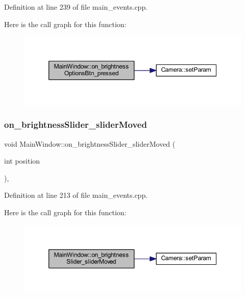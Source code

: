 Definition at line 239 of file main\+\_\+events.\+cpp.

Here is the call graph for this function\+:
\nopagebreak
\begin{figure}[H]
\begin{center}
\leavevmode
\includegraphics[width=350pt]{classMainWindow_a8b3a042f694a5013ad5e65253bc3a0ae_cgraph}
\end{center}
\end{figure}
\mbox{\label{classMainWindow_aaaa1dd957c7f0cc75f5dec42ef429c81}} 
\subsubsection{\texorpdfstring{on\_brightnessSlider\_sliderMoved}{on\_brightnessSlider\_sliderMoved}}
{\footnotesize\ttfamily void Main\+Window\+::on\+\_\+brightness\+Slider\+\_\+slider\+Moved (\begin{DoxyParamCaption}\item[{int}]{position }\end{DoxyParamCaption})\hspace{0.3cm}{\ttfamily [private]}, {\ttfamily [slot]}}



Definition at line 213 of file main\+\_\+events.\+cpp.

Here is the call graph for this function\+:
\nopagebreak
\begin{figure}[H]
\begin{center}
\leavevmode
\includegraphics[width=350pt]{classMainWindow_aaaa1dd957c7f0cc75f5dec42ef429c81_cgraph}
\end{center}
\end{figure}
\mbox{\label{classMainWindow_a2a1fcefe2bf1f110eb2c589ac57b07d7}} 
